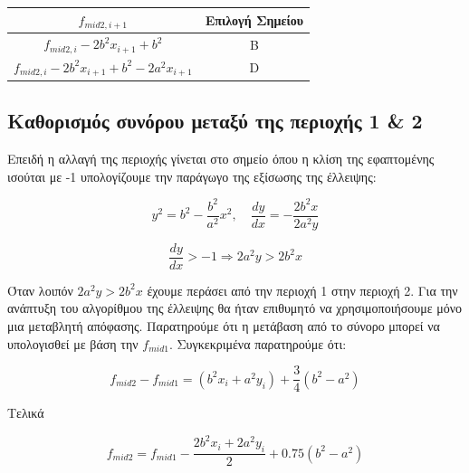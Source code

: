 \begin{table}[htb]
    \centering
    \begin{tabular}{@{}c|c@{}}
        \toprule
        $f_{mid2,i+1}$ & Επιλογή Σημείου \\
        \midrule
        $f_{mid2,i} - 2b^2 x_{i+1} + b^2$ & B \\
        $f_{mid2,i} - 2b^2 x_{i+1} + b^2 - 2a^2 x_{i+1}$ & D \\
        \bottomrule
    \end{tabular}
\end{table}

\subsection{Καθορισμός συνόρου μεταξύ της περιοχής 1 \& 2}

Επειδή η αλλαγή της περιοχής γίνεται στο σημείο όπου η κλίση της εφαπτομένης ισούται με -1 υπολογίζουμε την παράγωγο της εξίσωσης της έλλειψης:

\begin{equation}
    y^2 = b^2 - \frac{b^2}{a^2} x^2, \quad \frac{dy}{dx} = - \frac{2b^2 x}{2a^2 y}
\end{equation}

\begin{equation}
    \frac{dy}{dx} > -1 \Rightarrow 2a^2 y > 2b^2 x
\end{equation}

Όταν λοιπόν $2a^2 y > 2b^2 x$ έχουμε περάσει από την περιοχή 1 στην περιοχή 2. Για την ανάπτυξη του αλγορίθμου της έλλειψης θα ήταν επιθυμητό να χρησιμοποιήσουμε μόνο μια μεταβλητή απόφασης. Παρατηρούμε ότι η μετάβαση από το σύνορο μπορεί να υπολογισθεί με βάση την $f_{mid1}$. Συγκεκριμένα παρατηρούμε ότι:

\begin{equation}
    f_{mid2} - f_{mid1} = \left( b^2 x_i + a^2 y_i \right) + \frac{3}{4} \left( b^2 - a^2 \right)
\end{equation}

Τελικά

\begin{equation}
    f_{mid2} = f_{mid1} - \frac{2b^2 x_i + 2a^2 y_i}{2} + 0.75 \left( b^2 - a^2 \right)
\end{equation}

